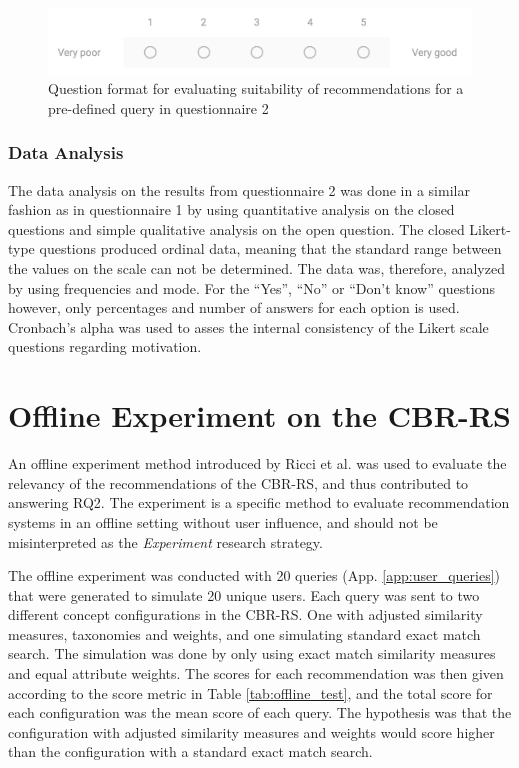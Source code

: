 \begin{figure}[H]
    \centering
    \includegraphics[width=1\textwidth]{fig/rate_search.png}
    \caption[Question format for evaluating suitability of recommendations]{Question format for evaluating suitability of recommendations for a pre-defined query in questionnaire 2}
    \label{fig:q2_rate_search}
\end{figure}


\subsubsection{Data Analysis}
The data analysis on the results from questionnaire 2 was done in a similar fashion as in questionnaire 1 by using quantitative analysis on the closed questions and simple qualitative analysis on the open question. The closed Likert-type questions produced ordinal data, meaning that the standard range between the values on the scale can not be determined. The data was, therefore, analyzed by using frequencies and mode. For the \enquote{Yes}, \enquote{No} or \enquote{Don't know} questions however, only percentages and number of answers for each option is used. Cronbach's alpha was used to asses the internal consistency of the Likert scale questions regarding motivation. 

\section{Offline Experiment on the CBR-RS}\label{sec:observation_test}

An offline experiment method introduced by Ricci et al. \cite{ricci2011introduction} was used to evaluate the relevancy of the recommendations of the CBR-RS, and thus contributed to answering RQ2. The experiment is a specific method to evaluate recommendation systems in an offline setting without user influence, and should not be misinterpreted as the \textit{Experiment} research strategy.

The offline experiment was conducted with 20 queries (App. \ref{app:user_queries}) that were generated to simulate 20 unique users. Each query was sent to two different concept configurations in the CBR-RS. One with adjusted similarity measures, taxonomies and weights, and one simulating standard exact match search. The simulation was done by only using exact match similarity measures and equal attribute weights. The scores for each recommendation was then given according to the score metric in Table \ref{tab:offline_test}, and the total score for each configuration was the mean score of each query. The hypothesis was that the configuration with adjusted similarity measures and weights would score higher than the configuration with a standard exact match search. 

